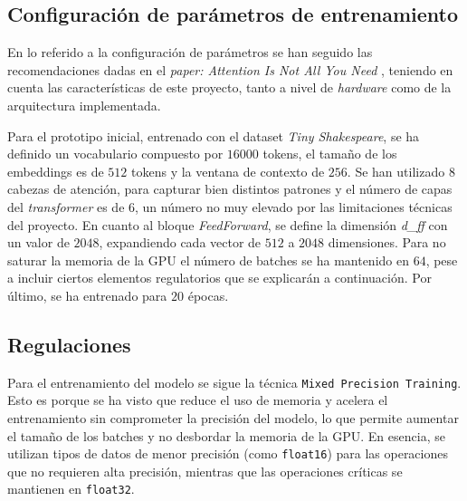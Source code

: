 \documentclass[11pt]{book}
\begin{document}
\subsection{Configuración de parámetros de entrenamiento}

En lo referido a la configuración de parámetros se han seguido las recomendaciones dadas en el \textit{paper: Attention Is Not All You Need} \parencite{gerber2025ffn}, teniendo en cuenta las características de este proyecto, tanto a nivel de  \textit{hardware} como de la arquitectura implementada.

Para el prototipo inicial, entrenado con el dataset \textit{Tiny Shakespeare}, se ha definido un vocabulario compuesto por $16000$ tokens, el tamaño de los embeddings es de $512$ tokens y la ventana de contexto de $256$. Se han utilizado $8$ cabezas de atención, para capturar bien distintos patrones y el número de capas del \textit{transformer} es de $6$, un número no muy elevado por las limitaciones técnicas del proyecto. En cuanto al bloque \textit{FeedForward}, se define la dimensión \textit{d\_ff} con un valor de $2048$, expandiendo cada vector de $512$ a $2048$ dimensiones. Para no saturar la memoria de la GPU el número de batches se ha mantenido en $64$, pese a incluir ciertos elementos regulatorios que se explicarán a continuación. Por último, se ha entrenado para $20$ épocas.


\subsection{Regulaciones}

Para el entrenamiento del modelo se sigue la técnica \texttt{Mixed Precision Training}. Esto es porque se ha visto que reduce el uso de memoria y acelera el entrenamiento sin comprometer la precisión del modelo, lo que permite aumentar el tamaño de los batches y no desbordar la memoria de la GPU. En esencia, se utilizan tipos de datos de menor precisión (como \texttt{float16}) para las operaciones que no requieren alta precisión, mientras que las operaciones críticas se mantienen en \texttt{float32}. 
\end{document}
